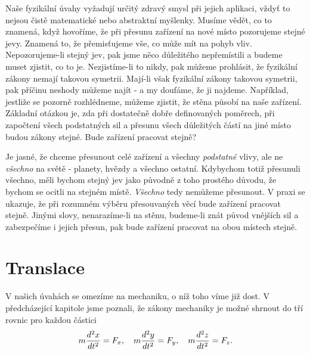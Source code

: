     Naše fyzikální úvahy vyžadují určitý zdravý smysl při jejich aplikaci, vždyť to nejsou čistě 
    matematické nebo abstraktní myšlenky. Musíme vědět, co to znamená, když hovoříme, že při 
    přesunu zařízení na nové místo pozorujeme stejné jevy. Znamená to, že přemisťujeme vše, co může 
    mít na pohyb vliv. Nepozorujeme-li stejný jev, pak jsme něco důležitého nepřemístili a budeme 
    muset zjistit, co to je. Nezjistíme-li to nikdy, pak můžeme prohlásit, že fyzikální zákony 
    nemají takovou symetrii. Mají-li však fyzikální zákony takovou symetrii, pak příčinu neshody 
    můžeme najít - a my doufáme, že ji najdeme. Například, jestliže se pozorně rozhlédneme, můžeme 
    zjistit, že stěna působí na naše zařízení. Základní otázkou je, zda při dostatečně dobře 
    definovaných poměrech, při započtení všech podstatných sil a přesunu všech důležitých částí na 
    jiné místo budou zákony stejné. Bude zařízení pracovat stejně?
    
    Je jasné, že chceme přesunout celé zařízení a všechny \emph{podstatné} vlivy, ale ne 
    \emph{všechno} na světě - planety, hvězdy a všechno ostatní. Kdybychom totiž přesunuli všechno, 
    měli bychom stejný jev jako původně z toho prostého důvodu, že bychom se ocitli na stejném 
    místě. \emph{Všechno} tedy nemůžeme přesunout. V praxi se ukazuje, že při rozumném výběru 
    přesouvaných věcí bude zařízení pracovat stejně. Jinými slovy, nenarazíme-li na stěnu, 
    budeme-li znát původ vnějších sil a zabezpečíme i jejich přesun, pak bude zařízení pracovat na 
    obou místech stejně.
    
  \section{Translace}
    V našich úvahách se omezíme na mechaniku, o níž toho víme již dost. V předcházející kapitole
    jsme poznali, že zákony mechaniky je možné shrnout do tří rovnic pro každou částici
    \begin{equation}\label{fyz:eq145}
      m\dfrac{d^2 x}{d t^2} = F_x, \quad
      m\dfrac{d^2 y}{d t^2} = F_y, \quad
      m\dfrac{d^2 z}{d t^2} = F_z.
    \end{equation}

